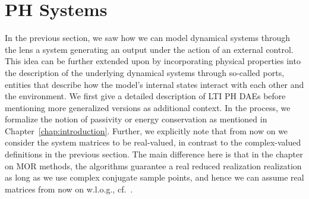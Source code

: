 \section{\acl{PH} Systems}\label{sec:phltis}

In the previous section, we saw how we can model dynamical systems through the lens a system generating an output under the action of an external control.
This idea can be further extended upon by incorporating physical properties into the description of the underlying dynamical systems through so-called ports, entities that describe how the model's internal states interact with each other and the environment.
We first give a detailed description of \ac{LTI} \ac{PH} \acp{DAE} before mentioning more generalized versions as additional context.
In the process, we formalize the notion of passivity or energy conservation as mentioned in Chapter~\ref{chap:introduction}.
Further, we explicitly note that from now on we consider the system matrices to be real-valued, in contrast to the complex-valued definitions in the previous section.
The main difference here is that in the chapter on \ac{MOR} methods, the algorithms guarantee a real reduced realization realization as long as we use complex conjugate sample points, and hence we can assume real matrices from now on w.l.o.g., cf.~\cite{Gugercin2008}.

